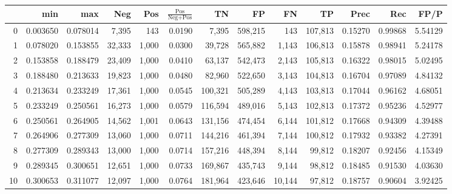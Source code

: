 \begin{tabular}{rrrrrrrrrrrrr}
\toprule
{} &       min &       max &     Neg &    Pos & $\frac{\text{Pos}}{\text{Neg}+\text{Pos}}$ &       TN &       FP &       FN &       TP &     Prec &      Rec &     FP/P \\
\midrule
0   &  0.003650 &  0.078014 &   7,395 &    143 &                                     0.0190 &    7,395 &  598,215 &      143 &  107,813 &  0.15270 &  0.99868 &  5.54129 \\
1   &  0.078020 &  0.153855 &  32,333 &  1,000 &                                     0.0300 &   39,728 &  565,882 &    1,143 &  106,813 &  0.15878 &  0.98941 &  5.24178 \\
2   &  0.153858 &  0.188479 &  23,409 &  1,000 &                                     0.0410 &   63,137 &  542,473 &    2,143 &  105,813 &  0.16322 &  0.98015 &  5.02495 \\
3   &  0.188480 &  0.213633 &  19,823 &  1,000 &                                     0.0480 &   82,960 &  522,650 &    3,143 &  104,813 &  0.16704 &  0.97089 &  4.84132 \\
4   &  0.213634 &  0.233249 &  17,361 &  1,000 &                                     0.0545 &  100,321 &  505,289 &    4,143 &  103,813 &  0.17044 &  0.96162 &  4.68051 \\
5   &  0.233249 &  0.250561 &  16,273 &  1,000 &                                     0.0579 &  116,594 &  489,016 &    5,143 &  102,813 &  0.17372 &  0.95236 &  4.52977 \\
6   &  0.250561 &  0.264905 &  14,562 &  1,001 &                                     0.0643 &  131,156 &  474,454 &    6,144 &  101,812 &  0.17668 &  0.94309 &  4.39488 \\
7   &  0.264906 &  0.277309 &  13,060 &  1,000 &                                     0.0711 &  144,216 &  461,394 &    7,144 &  100,812 &  0.17932 &  0.93382 &  4.27391 \\
8   &  0.277309 &  0.289343 &  13,000 &  1,000 &                                     0.0714 &  157,216 &  448,394 &    8,144 &   99,812 &  0.18207 &  0.92456 &  4.15349 \\
9   &  0.289345 &  0.300651 &  12,651 &  1,000 &                                     0.0733 &  169,867 &  435,743 &    9,144 &   98,812 &  0.18485 &  0.91530 &  4.03630 \\
10  &  0.300653 &  0.311077 &  12,097 &  1,000 &                                     0.0764 &  181,964 &  423,646 &   10,144 &   97,812 &  0.18757 &  0.90604 &  3.92425 \\

\end{tabular}
